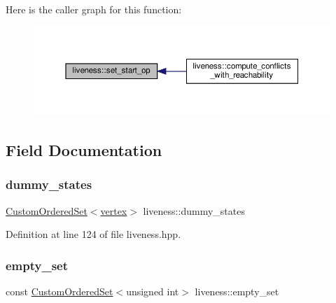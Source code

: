 Here is the caller graph for this function\+:
\nopagebreak
\begin{figure}[H]
\begin{center}
\leavevmode
\includegraphics[width=350pt]{d3/d1f/classliveness_a881b06559227c29787f7c0d19a3e9245_icgraph}
\end{center}
\end{figure}


\subsection{Field Documentation}
\mbox{\label{classliveness_a0f2ac91d8d96d6865b29860e726fde00}} 
\subsubsection{\texorpdfstring{dummy\+\_\+states}{dummy\_states}}
{\footnotesize\ttfamily \hyperlink{classCustomOrderedSet}{Custom\+Ordered\+Set}$<$\hyperlink{graph_8hpp_abefdcf0544e601805af44eca032cca14}{vertex}$>$ liveness\+::dummy\+\_\+states\hspace{0.3cm}{\ttfamily [private]}}



Definition at line 124 of file liveness.\+hpp.

\mbox{\label{classliveness_a450df2b0f6676fe3bb9eb4950bf606b4}} 
\subsubsection{\texorpdfstring{empty\+\_\+set}{empty\_set}}
{\footnotesize\ttfamily const \hyperlink{classCustomOrderedSet}{Custom\+Ordered\+Set}$<$unsigned int$>$ liveness\+::empty\+\_\+set\hspace{0.3cm}{\ttfamily [private]}}



